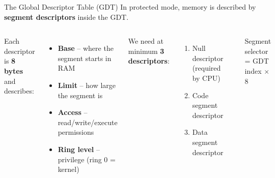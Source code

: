 \documentclass[aspectratio=169]{beamer}
\begin{document}
\begin{frame}{The Global Descriptor Table (GDT)}
  In protected mode, memory is described by \textbf{segment descriptors} inside the GDT.
  \vspace{4pt}
  \begin{columns}[T]
    Each descriptor is \textbf{8 bytes} and describes:
    \begin{itemize}
      \item \textbf{Base} -- where the segment starts in RAM
      \item \textbf{Limit} -- how large the segment is
      \item \textbf{Access} -- read/write/execute permissions
      \item \textbf{Ring level} -- privilege (ring 0 = kernel)
    \end{itemize}
    \vspace{6pt}
    We need at minimum \textbf{3 descriptors}:
    \begin{enumerate}
      \item Null descriptor (required by CPU)
      \item Code segment descriptor
      \item Data segment descriptor
    \end{enumerate}
    \vspace{6pt}
    \begin{center}
    \end{center}
    \vspace{6pt}
    \small Segment selector = GDT index $\times$ 8
  \end{columns}
\end{frame}
\end{document}
